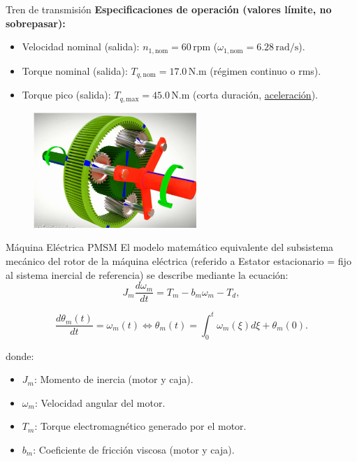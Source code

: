 \documentclass[12pt]{beamer}
\begin{document}
\begin{frame}{Tren de transmisión}
\textbf{Especificaciones de operación (valores límite, no sobrepasar):}
\begin{itemize}\footnotesize
    \item Velocidad nominal (salida): \( n_{1,\text{nom}} = 60 \, \text{rpm} \) (\( \omega_{1,\text{nom}} = 6.28 \, \text{rad/s} \)).
    \item Torque nominal (salida): \( T_{q,\text{nom}} = 17.0 \, \text{N.m} \) (régimen continuo o rms).
    \item Torque pico (salida): \( T_{q,\text{max}} = 45.0 \, \text{N.m} \) (corta duración, \underline{aceleración}).
\end{itemize}

    \begin{figure}[H]
        \centering
        \includegraphics[width=0.55\textwidth]{Imagenes/tren_transmision.png}
        \label{fig:tren_transmision}
    \end{figure}
\end{frame}

\begin{frame}{Máquina Eléctrica PMSM}
El modelo matemático equivalente del subsistema mecánico del rotor de la máquina eléctrica (referido a Estator estacionario = fijo al sistema inercial de referencia) se describe mediante la ecuación:
\begin{equation}
\label{eq:subsistema_mecanico_maquina_pmsm}
    J_m \frac{d\omega_m}{dt} = T_m - b_m \omega_m - T_d,
\end{equation}

\begin{equation}
    \frac{d\theta_m(t)}{dt} = \omega_m(t) \iff \theta_m(t) = \int_{0}^{t} \omega_m(\xi) d\xi + \theta_m(0).
\end{equation}

donde:
\begin{itemize}
    \item $J_m$: Momento de inercia (motor y caja).
    \item $\omega_m$: Velocidad angular del motor.
    \item $T_m$: Torque electromagnético generado por el motor.
    \item $b_m$: Coeficiente de fricción viscosa (motor y caja).
\end{itemize}
\end{frame}
\end{document}
